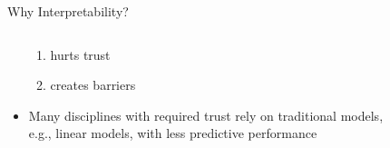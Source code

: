 \documentclass[11pt,compress,t,notes=noshow, aspectratio=169, xcolor=table]{beamer}
\begin{document}
\begin{frame}{Why Interpretability?}
\begin{columns}[T]
\begin{column}{0.8\textwidth}
\begin{itemize}
{			\begin{enumerate}
				\item hurts trust
				\item creates barriers
			\end{enumerate}}
			\item<5>[\,$\leadsto$] Many disciplines with required trust rely on traditional models,\\ e.g., linear models, with less predictive performance
		\end{itemize}
	\end{column}
	\begin{column}{0.2\textwidth}  %
\end{column}
\end{columns}
\end{frame}
\end{document}
